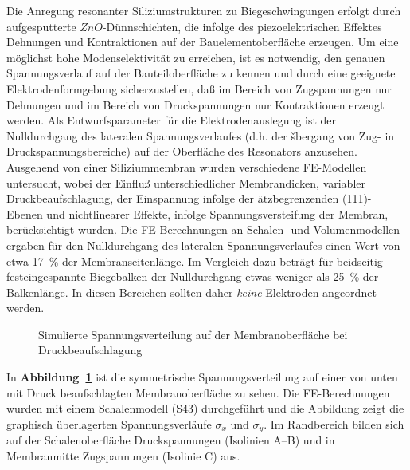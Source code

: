 Die Anregung resonanter Siliziumstrukturen zu Biegeschwingungen erfolgt durch
aufgesputterte $ZnO$-Dünnschichten, die infolge des piezoelektrischen Effektes
Dehnungen und Kontraktionen auf der Bauelementoberfläche erzeugen. Um eine
möglichst hohe Moden\-selektivität zu erreichen, ist es notwendig, den genauen
Spannungsverlauf auf der Bauteil\-oberfläche zu kennen und durch eine
geeignete Elektrodenformgebung sicherzustellen, daß im Bereich von
Zugspannungen nur Dehnungen und im Bereich von Druckspannungen nur
Kontraktionen
erzeugt werden. Als Entwurfsparameter für die Elektrodenauslegung ist der
Nulldurchgang des lateralen Spannungsverlaufes (d.h. der šbergang von Zug-
in Druckspannungsbereiche) auf der Oberfläche des Resonators anzusehen.
Ausgehend von einer Siliziummembran wurden verschiedene FE-Modellen
untersucht, wobei der Einfluß unterschiedlicher Membrandicken,
variabler Druckbeaufschlagung, der Einspannung infolge der ätzbegrenzenden
(111)-Ebenen und nichtlinearer Effekte, infolge Spannungsversteifung der
Membran, berücksichtigt wurden. Die FE-Berechnungen an Schalen- und
Volumenmodellen ergaben für den Nulldurchgang des lateralen
Spannungsverlaufes einen Wert von etwa
17~\% der Membranseitenlänge. Im Vergleich dazu beträgt für beidseitig
festeingespannte Biegebalken der Nulldurchgang etwas weniger als 25~\% der
Balkenlänge. In diesen Bereichen sollten daher {\em keine} Elektroden
angeordnet werden. \\
\begin{figure}[htb]

\begin{center}

\setmembran
\end{center}

\caption{\label{abbmembranspan}
 Simulierte Spannungsverteilung auf der Membranoberfläche bei
 Druckbeaufschlagung}
\end{figure}
In {\bf Abbildung~\ref{abbmembranspan}} ist die symmetrische
Spannungsverteilung auf einer von unten mit Druck beaufschlagten
Membranoberfläche zu sehen. Die FE-Berechnungen wurden mit einem
Schalenmodell (S43) durchgeführt und die Abbildung zeigt die graphisch
überlagerten Spannungsverläufe $\sigma_{x}$ und $\sigma_{y}$.
Im Randbereich bilden sich auf der Schalenoberfläche Druckspannungen
(Isolinien A--B) und in Membranmitte Zugspannungen (Isolinie C) aus.
